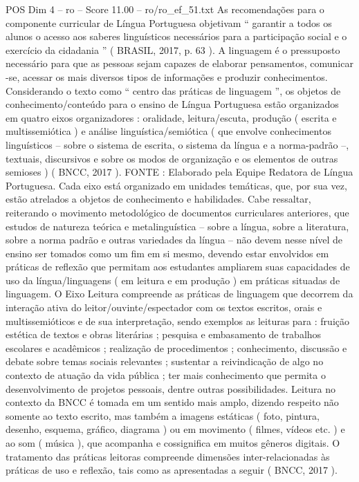 \begin{textsample}{POS Dim 4 – ro – Score 11.00 – ro/ro\_ef\_51.txt}
As recomendações para o componente curricular de Língua Portuguesa objetivam “ garantir a todos os alunos o acesso aos saberes linguísticos necessários para a participação social e o exercício da cidadania ” ( BRASIL, 2017, p. 63 ).
A linguagem é o pressuposto necessário para que as pessoas sejam capazes de elaborar pensamentos, comunicar -se, acessar os mais diversos tipos de informações e produzir conhecimentos.
Considerando o texto como “ centro das práticas de linguagem ”, os objetos de conhecimento/conteúdo para o ensino de Língua Portuguesa estão organizados em quatro eixos organizadores : oralidade, leitura/escuta, produção ( escrita e multissemiótica ) e análise linguística/semiótica ( que envolve conhecimentos linguísticos – sobre o sistema de escrita, o sistema da língua e a norma-padrão –, textuais, discursivos e sobre os modos de organização e os elementos de outras semioses ) ( BNCC, 2017 ).
FONTE : Elaborado pela Equipe Redatora de Língua Portuguesa.
Cada eixo está organizado em unidades temáticas, que, por sua vez, estão atrelados a objetos de conhecimento e habilidades.
Cabe ressaltar, reiterando o movimento metodológico de documentos curriculares anteriores, que estudos de natureza teórica e metalinguística – sobre a língua, sobre a literatura, sobre a norma padrão e outras variedades da língua – não devem nesse nível de ensino ser tomados como um fim em si mesmo, devendo estar envolvidos em práticas de reflexão que permitam aos estudantes ampliarem suas capacidades de uso da língua/linguagens ( em leitura e em produção ) em práticas situadas de linguagem.
O Eixo Leitura compreende as práticas de linguagem que decorrem da interação ativa do leitor/ouvinte/espectador com os textos escritos, orais e multissemióticos e de sua interpretação, sendo exemplos as leituras para : fruição estética de textos e obras literárias ; pesquisa e embasamento de trabalhos escolares e acadêmicos ; realização de procedimentos ; conhecimento, discussão e debate sobre temas sociais relevantes ; sustentar a reivindicação de algo no contexto de atuação da vida pública ; ter mais conhecimento que permita o desenvolvimento de projetos pessoais, dentre outras possibilidades.
Leitura no contexto da BNCC é tomada em um sentido mais amplo, dizendo respeito não somente ao texto escrito, mas também a imagens estáticas ( foto, pintura, desenho, esquema, gráfico, diagrama ) ou em movimento ( filmes, vídeos etc. ) e ao som ( música ), que acompanha e cossignifica em muitos gêneros digitais.
O tratamento das práticas leitoras compreende dimensões inter-relacionadas às práticas de uso e reflexão, tais como as apresentadas a seguir ( BNCC, 2017 ).

\end{textsample}

